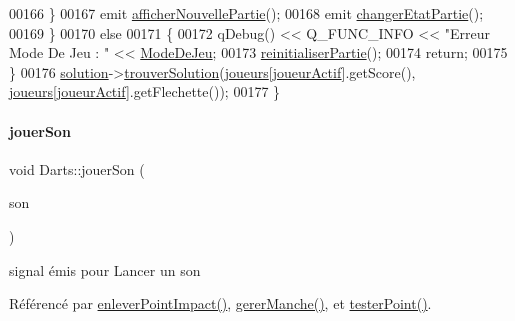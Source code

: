 \begin{DoxyCode}
00166         \}
00167         emit \hyperlink{class_darts_a650d6efdef25756bfbbacb0bb3549c43}{afficherNouvellePartie}();
00168         emit \hyperlink{class_darts_a25cf64530c84d7aa261a4806e88dcd6e}{changerEtatPartie}();
00169     \}
00170     \textcolor{keywordflow}{else}
00171     \{
00172         qDebug() << Q\_FUNC\_INFO << \textcolor{stringliteral}{"Erreur Mode De Jeu : "} << \hyperlink{class_darts_a281fd6201343dfb65ab81c93fd60f786}{ModeDeJeu};
00173         \hyperlink{class_darts_a70c68ed8bd56b63df203c25e6ed14f3b}{reinitialiserPartie}();
00174         \textcolor{keywordflow}{return};
00175     \}
00176     \hyperlink{class_darts_a40733010dc6ae4ce93140804b4d191ea}{solution}->\hyperlink{class_solution_a9ab0b0fd2b557f5abda8bd1a6da641e4}{trouverSolution}(\hyperlink{class_darts_a81bc116f3ae70cea1f492f87f01901c7}{joueurs}[\hyperlink{class_darts_a68fb01b9aad6502e4429dfbf2a72d50b}{joueurActif}].getScore(),
      \hyperlink{class_darts_a81bc116f3ae70cea1f492f87f01901c7}{joueurs}[\hyperlink{class_darts_a68fb01b9aad6502e4429dfbf2a72d50b}{joueurActif}].getFlechette());
00177 \}
\end{DoxyCode}
\mbox{\label{class_darts_a87995841c66fc321b63c28fa8a786347}} 
\paragraph{\texorpdfstring{jouer\+Son}{jouerSon}}
{\footnotesize\ttfamily void Darts\+::jouer\+Son (\begin{DoxyParamCaption}\item[{Q\+String}]{son }\end{DoxyParamCaption})\hspace{0.3cm}{\ttfamily [signal]}}



signal émis pour Lancer un son 



Référencé par \hyperlink{darts_8cpp_source_l00274}{enlever\+Point\+Impact()}, \hyperlink{darts_8cpp_source_l00303}{gerer\+Manche()}, et \hyperlink{darts_8cpp_source_l00204}{tester\+Point()}.

\mbox{\label{class_darts_a70c1ccef5cb7e47bff1384041ad9a596}} 
